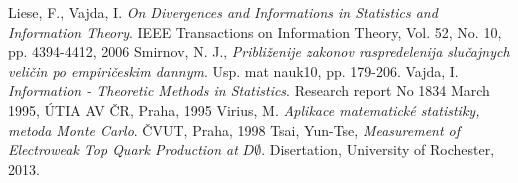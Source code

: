 \begin{thebibliography}{10}
Liese, F., Vajda, I. {\em On Divergences and Informations in Statistics and Information Theory}. IEEE Transactions on Information Theory, Vol. 52, No. 10, pp. 4394-4412, 2006
Smirnov, N. J., {\em Približenije zakonov raspredelenija slučajnych veličin po empiričeskim dannym}. Usp. mat nauk10, pp. 179-206.
Vajda, I. {\em Information - Theoretic Methods in Statistics}. Research report No 1834 March 1995, ÚTIA AV ČR, Praha, 1995
Virius, M. {\em Aplikace matematické statistiky, metoda Monte Carlo}. ČVUT, Praha, 1998
Tsai, Yun-Tse, {\em Measurement of Electroweak Top Quark Production at} $D\mathit{\emptyset}$. Disertation, University of Rochester, 2013.
\end{thebibliography}